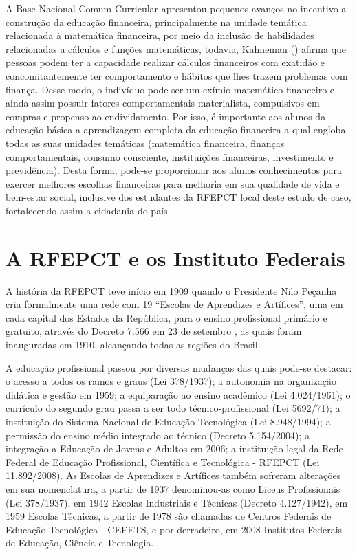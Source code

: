 A Base Nacional Comum Curricular apresentou pequenos avanços no incentivo a construção da educação financeira, principalmente na unidade temática relacionada à matemática financeira, por meio da inclusão de habilidades relacionadas a cálculos e funções matemáticas, todavia, Kahneman (\citeyear{kahneman2012}) afirma que pessoas podem ter a capacidade realizar cálculos financeiros com exatidão e concomitantemente ter comportamento e hábitos que lhes trazem problemas com finança. Desse modo, o indivíduo pode ser um exímio matemático financeiro e ainda assim possuir fatores comportamentais materialista, compulsivos em compras e propenso ao endividamento. Por isso, é importante aos alunos da educação básica a aprendizagem completa da educação financeira a qual engloba todas as suas unidades temáticas (matemática financeira, finanças comportamentais, consumo consciente, instituições financeiras, investimento e previdência). Desta forma, pode-se proporcionar aos alunos conhecimentos para exercer melhores escolhas financeiras para melhoria em sua qualidade de vida e bem-estar social, inclusive dos estudantes da RFEPCT local deste estudo de caso, fortalecendo assim a cidadania do país.

\section{A RFEPCT e os Instituto Federais}
A história da RFEPCT teve início em 1909 quando o Presidente Nilo Peçanha cria formalmente uma rede com 19 “Escolas de Aprendizes e Artífices”, uma em cada capital dos Estados da República, para o ensino profissional primário e gratuito, através do Decreto 7.566 em 23 de setembro \cite{brasil1909}, as quais foram inauguradas em 1910, alcançando todas as regiões do Brasil.

A educação profissional passou por diversas mudanças das quais pode-se destacar: o acesso a todos os ramos e graus (Lei 378/1937); a autonomia na organização didática e gestão em 1959; a equiparação ao ensino acadêmico (Lei 4.024/1961); o currículo do segundo grau passa a ser todo técnico-profissional (Lei 5692/71); a instituição do Sistema Nacional de Educação Tecnológica (Lei 8.948/1994); a permissão do ensino médio integrado ao técnico (Decreto 5.154/2004);  a integração a Educação de Jovens e Adultos em 2006; a instituição legal da Rede Federal de Educação Profissional, Científica e Tecnológica - RFEPCT (Lei 11.892/2008). As Escolas de Aprendizes e Artífices também sofreram alterações em sua nomenclatura, a partir de 1937 denominou-as como Liceus Profissionais (Lei 378/1937), em 1942 Escolas Industriais e Técnicas (Decreto 4.127/1942), em 1959 Escolas Técnicas, a partir de 1978 são chamadas de Centros Federais de Educação Tecnológica - CEFETS, e por derradeiro, em 2008 Institutos Federais de Educação, Ciência e Tecnologia.

